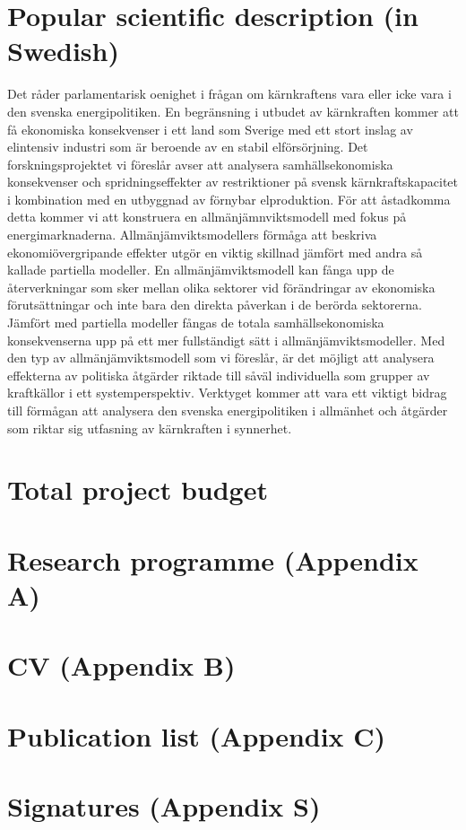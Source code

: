 \section{Popular scientific description (in Swedish)}
Det råder parlamentarisk oenighet i frågan om kärnkraftens vara eller icke vara i den svenska energipolitiken. En begränsning i utbudet av kärnkraften kommer att få ekonomiska konsekvenser i ett land som Sverige med ett stort inslag av elintensiv industri som är beroende av en stabil elförsörjning. Det forskningsprojektet vi föreslår avser att analysera samhällsekonomiska konsekvenser och spridningseffekter av restriktioner på svensk kärnkraftskapacitet i kombination med en utbyggnad av förnybar elproduktion. För att åstadkomma detta kommer vi att konstruera en allmänjämnviktsmodell med fokus på energimarknaderna. Allmänjämviktsmodellers förmåga att beskriva ekonomiövergripande effekter utgör en viktig skillnad jämfört med andra så kallade partiella modeller. En allmänjämviktsmodell kan fånga upp de återverkningar som sker mellan olika sektorer vid förändringar av ekonomiska förutsättningar och inte bara den direkta påverkan i de berörda sektorerna. Jämfört med partiella modeller fångas de totala samhällsekonomiska konsekvenserna upp på ett mer fullständigt sätt i allmänjämviktsmodeller. Med den typ av allmänjämviktsmodell som vi föreslår, är det möjligt att analysera effekterna av politiska åtgärder riktade till såväl individuella som grupper av kraftkällor i ett systemperspektiv. Verktyget kommer att vara ett viktigt bidrag till förmågan att analysera den svenska energipolitiken i allmänhet och åtgärder som riktar sig utfasning av kärnkraften i synnerhet.
\section{Total project budget}
\section{Research programme (Appendix A)}

\section{CV (Appendix B)}

\section{Publication list (Appendix C)}

\section{Signatures (Appendix S)}



\pagebreak
{}





